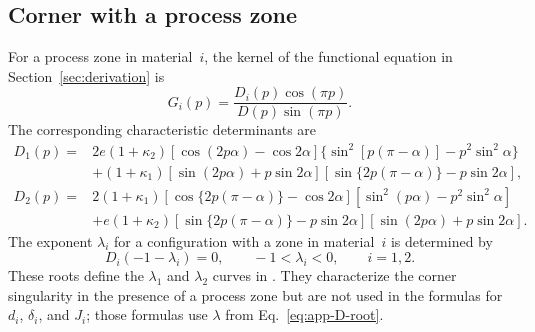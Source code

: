\subsection{Corner with a process zone}

For a process zone in material~$i$, the kernel of the functional equation
in Section~\ref{sec:derivation} is
\begin{equation*}
  G_i(p)=\frac{D_i(p)\cos(\pi p)}{D(p)\sin(\pi p)}.
\end{equation*}
The corresponding characteristic determinants are
\begin{equation}
\label{eq:app-post-zone-determinants}
\begin{aligned}
  D_1(p)={}&2e(1+\kappa_2)
  [\cos(2p\alpha)-\cos2\alpha]
  \{\sin^2[p(\pi-\alpha)]-p^2\sin^2\alpha\}\\
  &+(1+\kappa_1)
  [\sin(2p\alpha)+p\sin2\alpha]
  [\sin\{2p(\pi-\alpha)\}-p\sin2\alpha],\\[3pt]
  D_2(p)={}&2(1+\kappa_1)
  [\cos\{2p(\pi-\alpha)\}-\cos2\alpha]
  [\sin^2(p\alpha)-p^2\sin^2\alpha]\\
  &+e(1+\kappa_2)
  [\sin\{2p(\pi-\alpha)\}-p\sin2\alpha]
  [\sin(2p\alpha)+p\sin2\alpha].
\end{aligned}
\end{equation}
The exponent $\lambda_i$ for a configuration with a zone in
material~$i$ is determined by
\begin{equation}
\label{eq:app-post-zone-root}
  D_i(-1-\lambda_i)=0,
  \qquad -1<\lambda_i<0,
  \qquad i=1,2.
\end{equation}
These roots define the $\lambda_1$ and $\lambda_2$ curves in
\SingularityExponentFigure. They characterize the corner singularity in the
presence of a process zone but are not used in the formulas for $d_i$,
$\delta_i$, and $J_i$; those formulas use $\lambda$ from
Eq.~\eqref{eq:app-D-root}.
